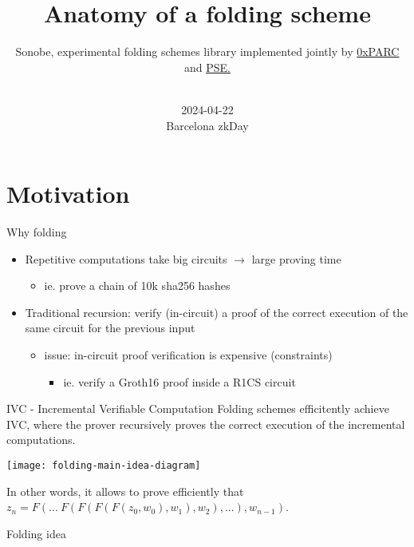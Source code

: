 \documentclass[t]{beamer}
\title{Anatomy of a folding scheme}
\author{\small{Sonobe, experimental folding schemes library implemented jointly by \href{https://0xparc.org}{0xPARC} and \href{https://pse.dev/}{PSE.}}}
\date{\vspace{1cm}\\\scriptsize{2024-04-22\\Barcelona zkDay}}
\begin{document}
\frame{\titlepage}




\section[Motivation]{Motivation}

\begin{frame}{Why folding}
  \begin{itemize}
    \item Repetitive computations take big circuits $\longrightarrow$ large proving time
    \begin{itemize}
      \item ie. prove a chain of 10k sha256 hashes
    \end{itemize}


    \item Traditional recursion: verify (in-circuit) a proof of the correct execution of the same circuit for the previous input
    \begin{itemize}
      \item issue: in-circuit proof verification is expensive (constraints)
      \begin{itemize}
        \item ie. verify a Groth16 proof inside a R1CS circuit
      \end{itemize}
    \end{itemize}
  \end{itemize}

\end{frame}

\begin{frame}{IVC - Incremental Verifiable Computation}
  Folding schemes efficitently achieve IVC, where the prover recursively proves the correct execution of the incremental computations.

  \texttt{[image: folding-main-idea-diagram]}

  In other words, it allows to prove efficiently that $z_n = F(...~F(F(F(F(z_0, w_0), w_1), w_2), ...), w_{n-1})$.

\end{frame}


\begin{frame}{Folding idea}
\end{frame}
\end{document}
